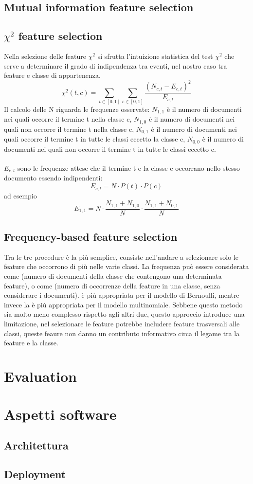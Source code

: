 \documentclass{article}
\theoremstyle{plain}
\theoremstyle{definition}
\begin{document}
\subsection{Mutual information feature selection}
\subsection{$\chi^2$ feature selection}
Nella selezione delle feature $\chi^2$ si sfrutta l'intuizione statistica del test $\chi^2$ che serve a determinare il grado di indipendenza tra eventi, nel nostro caso tra feature e classe di appartenenza.
\[\chi^2(t,c)=\sum_{t \in [0,1]} \sum_{c \in [0,1]} \frac{(N_{c,t} - E_{c,t})^2}{E_{c,t}} \]  Il calcolo delle N riguarda le frequenze osservate: $N_{1,1}$ è il numero di documenti nei quali occorre il termine t nella classe c, $N_{1,0}$ è il numero di documenti nei quali non occorre il termine t nella classe c, $N_{0,1}$ è il numero di documenti nei quali occorre il termine t in tutte le classi eccetto la classe c, $N_{0,0}$ è il numero di documenti nei quali non occorre il termine t in tutte le classi eccetto c. 
\\
\\
$E_{c,t}$ sono le frequenze attese che il termine t e la classe c occorrano nello stesso documento essendo indipendenti:
\[ E_{c,t}= N \cdot P(t) \cdot P(c) \] 
ad esempio
\[ E_{1,1}= N \cdot \frac{N_{1,1} + N_{1,0}}{N} \cdot \frac{N_{1,1} + N_{0,1}}{N} \]

\subsection{Frequency-based feature selection}
Tra le tre procedure è la più semplice, consiste nell'andare a selezionare solo le feature che occorrono di più nelle varie classi. La frequenza può essere considerata come  (numero di documenti della classe che contengono una determinata feature), o come  (numero di occorrenze della feature in una classe, senza considerare i documenti).
 è più appropriata per il modello di Bernoulli, mentre invece la  è più appropriata per il modello multinomiale. Sebbene questo metodo sia molto meno complesso rispetto agli altri due, questo approccio introduce una limitazione, nel selezionare le feature potrebbe includere feature trasversali alle classi, queste feaure non danno un contributo informativo circa il legame tra la feature e la classe.

\newpage
\section{Evaluation}

\newpage
\section{Aspetti software}
\subsection{Architettura}
\subsection{Deployment}
\end{document}
